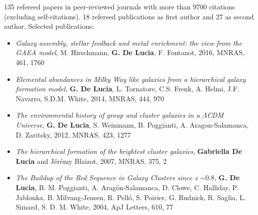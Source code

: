 \documentclass[fancyheadings,12pt,a4paper]{article}
\begin{document}
\smallskip\smallskip{} 135
refereed papers in peer-reviewed journals with more than 9700 citations
(excluding self-citations). 18 refereed publications as first author and 27 as
second author. Selected publications:
\begin{itemize}
\item
\emph{Galaxy assembly, stellar feedback and metal enrichment: the view from the
  GAEA model}, M. Hirschmann, {\bf G. De Lucia}, F. Fontanot, 2016, MNRAS, 461,
1760\vspace{-0.18truecm}
\item
\emph{Elemental abundances in Milky Way like galaxies from a hierarchical
  galaxy formation model}, {\bf G. De Lucia}, L. Tornatore, C.S. Frenk,
A. Helmi, J.F. Navarro, S.D.M. White, 2014, MNRAS, 444, 970\vspace{-0.18truecm}
\item
\emph{The environmental history of group and cluster galaxies in a $\Lambda$CDM
  Universe}, {\bf G. De Lucia}, S. Weinmann, B. Poggianti, A. Aragon-Salamanca,
D. Zaritsky, 2012, MNRAS, 423, 1277\vspace{-0.18truecm}
\item
\emph{The hierarchical formation of the brightest cluster galaxies}, {\bf
  Gabriella De Lucia} and J\'er\'emy Blaizot, 2007, MNRAS, 375,
2\vspace{-0.18truecm}
\item
\emph{The Buildup of the Red Sequence in Galaxy Clusters since z $\sim 0.8$},
     {\bf G. De Lucia}, B. M. Poggianti, A. Arag{\'o}n-Salamanca, D. Clowe,
     C. Halliday, P. Jablonka, B. Milvang-Jensen, R. Pell{\'o}, S. Poirier,
     G. Rudnick, R. Saglia, L. Simard, S. D. M. White, 2004, ApJ Letters, 610,
     77

\end{itemize}
\end{document}

